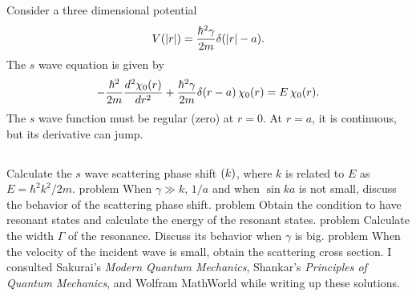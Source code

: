 \documentclass[11pt]{article}
\newcommand{\beq}{\begin{equation*}}
\newcommand{\eeq}{\end{equation*}}
\newenvironment{statement}[1]
{
	\section{#1}
	\color{darkgray}
	\ignorespaces
}
{
}
\newenvironment{problem}
{
	\color{darkgray}
	\subsection{}
	\ignorespaces
}
\newcommand{\Schrodinger}{Schr\"{o}dinger}
\begin{document}
\newcommand{\gam}{\gamma}
\newcommand{\chio}{\chi_0}
\newcommand{\chior}{\chio(r)}
\newcommand{\Gam}{\Gamma}

\begin{statement}{}
	Consider a three dimensional potential
	\beq
		V(\absr) = \frac{\hbar^2 \gam}{2m} \del(\absr - a).
	\eeq
	The $s$ wave {\Schrodinger} equation is given by
	\beq
		-\frac{\hbar^2}{2m} \dv[2]{\chior}{r} + \frac{\hbar^2 \gam}{2m} \del(r - a) \, \chior = E \,\chior.
	\eeq
	The $s$ wave function must be regular (zero) at $r = 0$.  At $r = a$, it is continuous, but its derivative can jump.
\end{statement}

\begin{problem}
	Calculate the $s$ wave scattering phase shift $\do(k)$, where $k$ is related to $E$ as $E = \hbar^2 k^2 / 2m$.
\end{problem}

\begin{problem}
	When $\gam \gg k$, $1/a$ and when $\sin ka$ is not small, discuss the behavior of the scattering phase shift.
\end{problem}

\begin{problem}
	Obtain the condition to have resonant states and calculate the energy of the resonant states.
\end{problem}

\begin{problem}
	Calculate the width $\Gam$ of the resonance.  Discuss its behavior when $\gam$ is big.
\end{problem}

\begin{problem}
	When the velocity of the incident wave is small, obtain the scattering cross section.
\end{problem}



\vfill
I consulted Sakurai's \emph{Modern Quantum Mechanics}, Shankar's \emph{Principles of Quantum Mechanics}, and Wolfram MathWorld while writing up these solutions.
\end{document}
